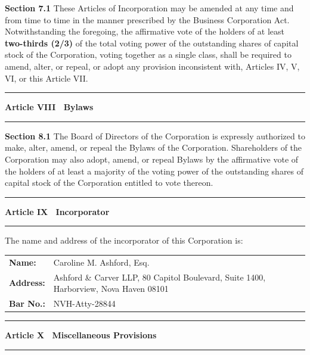 \documentclass[12pt,a4paper]{scrartcl}
\newcommand{\articletitle}[1]{%
  \par\vspace{4pt}\noindent%
  {\color{GoldAccent}\rule{\linewidth}{1.2pt}}\par\vspace{2pt}\noindent%
  {\large\bfseries\color{NavyDeep}#1}\par\vspace{4pt}\noindent%
  {\color{RuleGray}\rule{\linewidth}{0.4pt}}\par\vspace{6pt}\noindent%
}
\newcommand{\sectionlabel}[1]{%
  \noindent\textbf{\color{NavyDeep}#1}\quad%
}
\begin{document}
\sectionlabel{Section 7.1}These Articles of Incorporation may be amended at any time and from
time to time in the manner prescribed by the Business Corporation Act. Notwithstanding the
foregoing, the affirmative vote of the holders of at least \textbf{two-thirds (2/3)} of the
total voting power of the outstanding shares of capital stock of the Corporation, voting
together as a single class, shall be required to amend, alter, or repeal, or adopt any
provision inconsistent with, Articles IV, V, VI, or this Article VII.

\articletitle{Article VIII \textemdash\ Bylaws}

\sectionlabel{Section 8.1}The Board of Directors of the Corporation is expressly authorized
to make, alter, amend, or repeal the Bylaws of the Corporation. Shareholders of the
Corporation may also adopt, amend, or repeal Bylaws by the affirmative vote of the holders
of at least a majority of the voting power of the outstanding shares of capital stock of the
Corporation entitled to vote thereon.

\articletitle{Article IX \textemdash\ Incorporator}

The name and address of the incorporator of this Corporation is:

\vspace{8pt}
\begin{tcolorbox}[signbox]
\noindent\begin{tabularx}{\linewidth}{@{} l X @{}}
  \textbf{Name:}    & Caroline M. Ashford, Esq.                          \\[4pt]
  \textbf{Address:} & Ashford \& Carver LLP, 80 Capitol Boulevard,
                      Suite 1400, Harborview, Nova Haven 08101            \\[4pt]
  \textbf{Bar No.:} & NVH-Atty-28844                                     \\
\end{tabularx}
\end{tcolorbox}
\vspace{6pt}

\articletitle{Article X \textemdash\ Miscellaneous Provisions}
\end{document}
